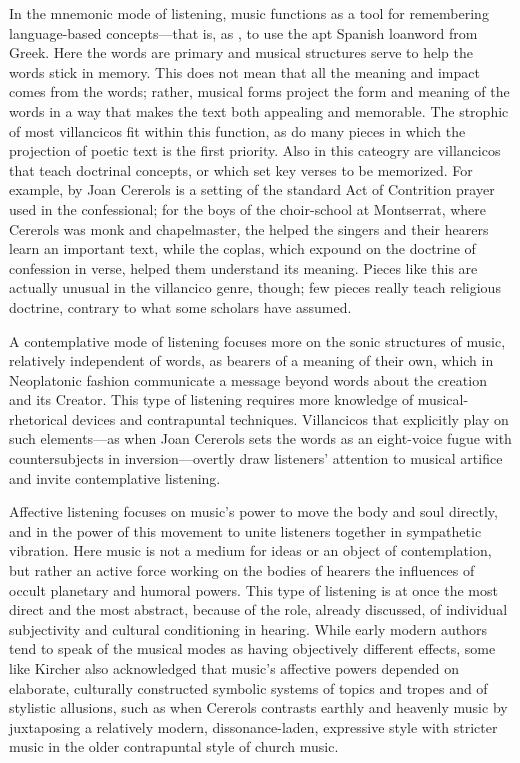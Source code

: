 \documentclass[tt]{vcbook-proposal}
\begin{document}
In the mnemonic mode of listening, music functions as a tool for remembering language-based concepts---that is, as , to use the apt Spanish loanword from Greek.
Here the words are primary and musical structures serve to help the words stick in memory.
This does not mean that all the meaning and impact comes from the words; rather, musical forms project the form and meaning of the words in a way that makes the text both appealing and memorable.
The strophic  of most villancicos fit within this function, as do many pieces in which the projection of poetic text is the first priority.
Also in this cateogry are villancicos that teach doctrinal concepts, or which set key verses to be memorized.
For example,  by Joan Cererols is a setting of the standard Act of Contrition prayer used in the confessional; for the boys of the choir-school at Montserrat, where Cererols was monk and chapelmaster, the  helped the singers and their hearers learn an important text, while the coplas, which expound on the doctrine of confession in verse, helped them understand its meaning.
Pieces like this are actually unusual in the villancico genre, though; few pieces really teach religious doctrine, contrary to what some scholars have assumed.

A contemplative mode of listening focuses more on the sonic structures of  music, relatively independent of words, as bearers of a meaning of their own, which in Neoplatonic fashion communicate a message beyond words about the creation and its Creator.
This type of listening requires more knowledge of musical-rhetorical devices and contrapuntal techniques. 
Villancicos that explicitly play on such elements---as when Joan Cererols sets the words  as an eight-voice fugue with countersubjects in inversion---overtly draw listeners' attention to musical artifice and invite contemplative listening.

Affective listening focuses on music's power to move the body and soul directly, and in the power of this movement to unite listeners together in sympathetic vibration.
Here music is not a medium for ideas or an object of contemplation, but rather an active force working on the bodies of hearers the influences of occult planetary and humoral powers.
This type of listening is at once the most direct and the most abstract, because of the role, already discussed, of individual subjectivity and cultural conditioning in hearing.
While early modern authors tend to speak of the musical modes as having objectively different effects, some like Kircher also acknowledged that music's affective powers depended on elaborate, culturally constructed symbolic systems of topics and tropes and of stylistic allusions, such as when Cererols contrasts earthly and heavenly music by juxtaposing a relatively modern, dissonance-laden, expressive style with stricter music in the older contrapuntal style of church music.
\end{document}
